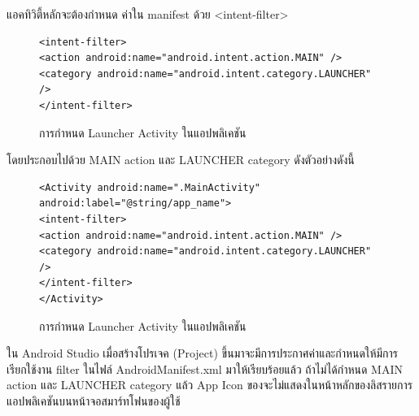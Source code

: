 	แอคทิวิตี้หลักจะต้องกำหนด ค่าใน manifest ด้วย <intent-filter> 
		\begin{figure}[H]
			{\begin{lstlisting}
<intent-filter>
<action android:name="android.intent.action.MAIN" />
<category android:name="android.intent.category.LAUNCHER" />
</intent-filter>
					\end{lstlisting}}
					\caption{การกำหนด Launcher Activity ในแอปพลิเคชัน}
					\label{Fig:Launcher}
		\end{figure}
โดยประกอบไปด้วย MAIN action และ LAUNCHER category ดังตัวอย่างดังนี้
				\begin{figure}[H]
					{\begin{lstlisting}
<Activity android:name=".MainActivity" android:label="@string/app_name">
<intent-filter>
<action android:name="android.intent.action.MAIN" />
<category android:name="android.intent.category.LAUNCHER" />
</intent-filter>
</Activity>
						\end{lstlisting}}
					\caption{การกำหนด Launcher Activity ในแอปพลิเคชัน}
					\label{Fig:category}
				\end{figure}
   ใน Android Studio เมื่อสร้างโปรเจค (Project) ขึ้นมาจะมีการประกาศค่าและกำหนดให้มีการเรียกใช้งาน filter ในไฟล์ AndroidManifest.xml มาให้เรียบร้อยแล้ว ถ้าไม่ได้กำหนด MAIN action และ LAUNCHER category แล้ว App Icon ของจะไม่แสดงในหน้าหลักของลิสรายการแอปพลิเคชันบนหน้าจอสมาร์ทโฟนของผู้ใช้
